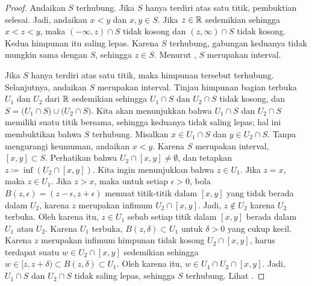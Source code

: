 \begin{proof}
Andaikan $S$ terhubung.  Jika $S$ hanya terdiri atas satu titik,
pembuktian selesai.  Jadi, andaikan $x < y$ dan $x,y \in S$.  Jika $z \in {\mathbb{R}}$
sedemikian sehingga $x < z < y$, maka $(-\infty,z) \cap S$ tidak kosong dan $(z,\infty) \cap
S$ tidak kosong.  Kedua himpunan itu saling lepas.  Karena
$S$ terhubung, gabungan keduanya tidak mungkin sama dengan $S$, sehingga $z \in S$.
Menurut , $S$ merupakan interval.

Jika $S$ hanya terdiri atas satu titik, maka himpunan tersebut terhubung.
Selanjutnya, andaikan $S$ merupakan interval.
Tinjau himpunan bagian terbuka $U_1$ dan $U_2$ dari ${\mathbb{R}}$ sedemikian sehingga
$U_1 \cap S$ dan $U_2 \cap S$ tidak kosong, dan
$S = 
\bigl( U_1 \cap S \bigr)
\cup
\bigl( U_2 \cap S \bigr)$.  Kita akan menunjukkan bahwa $U_1 \cap S$
dan $U_2 \cap S$ memiliki suatu titik bersama, sehingga keduanya tidak saling lepas;
hal ini membuktikan bahwa $S$ terhubung.
Misalkan $x \in U_1 \cap S$
dan $y \in U_2 \cap S$.  Tanpa mengurangi keumuman, andaikan $x < y$.
Karena $S$ merupakan interval, $[x,y] \subset S$.
Perhatikan bahwa $U_2 \cap [x,y] \neq \emptyset$, dan
tetapkan $z \coloneqq \inf (U_2 \cap [x,y])$.
Kita ingin menunjukkan bahwa $z \in U_1$.
Jika $z = x$, maka $z \in U_1$.
Jika $z > x$,
maka untuk setiap $\epsilon > 0$, bola $B(z,\epsilon) =
(z-\epsilon,z+\epsilon)$ memuat titik-titik dalam $[x,y]$ yang tidak berada dalam $U_2$,
karena $z$ merupakan infimum $U_2 \cap [x,y]$.
Jadi, $z \notin U_2$ karena $U_2$ terbuka.
Oleh karena itu, $z \in U_1$ sebab setiap titik dalam $[x,y]$ berada dalam
$U_1$ atau $U_2$.
Karena $U_1$ terbuka,
$B(z,\delta) \subset U_1$ untuk $\delta > 0$ yang cukup kecil.
Karena $z$ merupakan infimum himpunan tidak kosong $U_2 \cap [x,y]$,
harus terdapat suatu $w \in U_2 \cap [x,y]$
sedemikian sehingga $w \in [z,z+\delta) \subset B(z,\delta) \subset U_1$.
Oleh karena itu, $w \in U_1 \cap U_2 \cap [x,y]$.
Jadi, $U_1 \cap S$ dan $U_2 \cap S$ tidak saling lepas, sehingga
$S$ terhubung.
Lihat .
\end{proof}

\begin{myfigureht}
\caption{Bukti bahwa suatu interval terhubung.\label{fig:intervalcon}}
\end{myfigureht}

